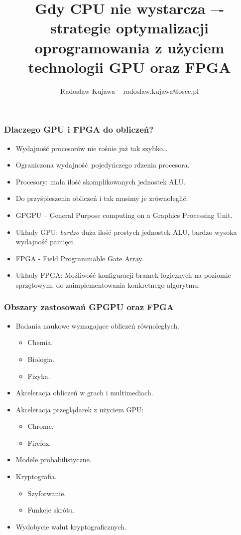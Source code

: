 \documentclass[dvipsnames,table]{beamer}
\title{Gdy CPU nie wystarcza –- strategie optymalizacji oprogramowania z użyciem technologii GPU oraz FPGA}
\author{Radosław Kujawa -- radoslaw.kujawa@osec.pl}
\institute{OSEC}
\begin{document}
\begin{frame}
	\titlepage
\end{frame}

\begin{frame}
	\frametitle{Dlaczego GPU i FPGA do obliczeń?}
\begin{itemize}
	\item Wydajność procesorów nie rośnie już tak szybko\dots
	\item Ograniczona wydajność pojedyńczego rdzenia procesora.
	\item Procesory: mała ilość skomplikowanych jednostek ALU.
	\item Do przyśpieszenia obliczeń i tak musimy je zrównoleglić.
	\item GPGPU -- General Purpose computing on a Graphics Processing Unit. 
	\item Układy GPU: {\em bardzo} duża ilość prostych jednostek ALU, bardzo wysoka wydajność pamięci.
	\item FPGA - Field Programmable Gate Array.
	\item Układy FPGA: Możliwość konfiguracji bramek logicznych na poziomie sprzętowym, do zaimplementowania konkretnego algorytmu.
	
\end{itemize}
\end{frame}


\begin{frame}
	\frametitle{Obszary zastosowań GPGPU oraz FPGA} 
\begin{itemize}
	\item Badania naukowe wymagające obliczeń równoległych.
	\begin{itemize}
		\item Chemia.
		\item Biologia.
		\item Fizyka.
	\end{itemize}
	\item Akceleracja obliczeń w grach i multimediach.
	\item Akceleracja przeglądarek z użyciem GPU:
	\begin{itemize}
		\item Chrome.
		\item Firefox.
	\end{itemize}
	\item Modele probabilistyczne.
	\item Kryptografia.
	\begin{itemize}
		\item Szyforwanie.
		\item Funkcje skrótu.
	\end{itemize}
	\item Wydobycie walut kryptograficznych.
\end{itemize}
\end{frame}
\end{document}
